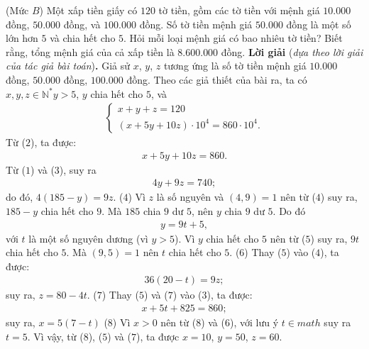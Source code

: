 \begin{multicols}{2}
	\setlength{\abovedisplayskip}{4pt}
	\setlength{\belowdisplayskip}{4pt}
	{}
	(Mức $B$) Một xấp tiền giấy có $120$ tờ tiền, gồm các tờ tiền với mệnh giá $10{.}000$ đồng, $50{.}000$ đồng, và $100{.}000$ đồng. Số tờ tiền mệnh giá $50{.}000$ đồng là một số lớn hơn $5$ và chia hết cho $5$. Hỏi mỗi loại mệnh giá có bao nhiêu tờ tiền? Biết rằng, tổng mệnh giá của cả xấp tiền là $8{.}600{.}000$ đồng.
	\vskip 0.05cm
	\textbf{\color{thachthuctoanhoc}Lời giải} (\textit{dựa theo lời giải của tác giả bài toán})\textbf{\color{thachthuctoanhoc}.}
	\vskip 0.05cm
	Giả sử $x$, $y$, $z$ tương ứng là số tờ tiền mệnh giá $10{.}000$ đồng, $50{.}000$ đồng, $100{.}000$ đồng.
	\vskip 0.05cm
	Theo các giả thiết của bài ra, ta có  $x,y,z \in \mathbb{N^*} y > 5$, $y$ chia hết cho $5$, và
	\begin{align*}
		\begin{cases}
			x + y + z = 120 \\
			(x + 5y + 10z) \cdot 10^4 = 860 \cdot 10^4. 
		\end{cases}
	\end{align*}
	Từ ($2$), ta được:
	\begin{align*}
		x + 5y + 10z = 860. \tag{$3$}
	\end{align*}
	Từ ($1$) và ($3$), suy ra
	\begin{align*}
		4y + 9z = 740;
	\end{align*}
	do đó, $4(185-y)= 9z$. \hfill ($4$)
	\vskip 0.05cm
	Vì $z$ là số nguyên và $(4, 9) = 1$ nên từ ($4$) suy ra, $185 - y$ chia hết cho $9$. Mà $185$ chia $9$ dư $5$, nên $y$ chia $9$ dư $5$. Do đó
	\begin{align*}
		y = 9t + 5,  \tag{$5$}
	\end{align*}
	với $t$ là một số nguyên dương (vì $y > 5$).
	\vskip 0.05cm
	Vì $y$ chia hết cho $5$ nên từ ($5$) suy ra, $9t$ chia hết cho $5$. Mà $(9, 5) = 1$ nên $t$ chia hết cho $5$.       \hfill           ($6$)
	\vskip 0.05cm
	Thay ($5$) vào ($4$), ta được:
	\begin{align*}
		36\left( {20 - t} \right) = 9z;
	\end{align*}
	suy ra, $z = 80 - 4t$. \hfill ($7$)
	\vskip 0.05cm
	Thay ($5$) và ($7$) vào ($3$), ta được:
	\begin{align*}
		x + 5t + 825 = 860;
	\end{align*}
	suy ra,  $x = 5 (7-t)$ \hfill ($8$)
	\vskip 0.05cm
	Vì $x > 0$ nên từ ($8$) và ($6$), với lưu ý $t \in math$  suy ra $t = 5$. Vì vậy, từ ($8$), ($5$) và ($7$), ta được $x = 10$, $y = 50$, $z = 60$.

\end{multicols}
